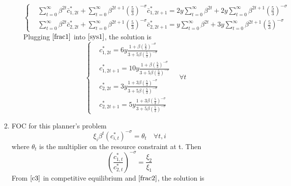 \documentclass{article}
\begin{document}
\begin{enumerate}
\begin{enumerate}
\begin{equation}
                \left\{\begin{aligned}
                    &\sum_{t=0}^\infty\beta^{2t}\bar{c}_{1,2t}^\ast+\sum_{t=0}^\infty\beta^{2t+1}\left(\frac{5}{3}\right)^{-\sigma}\bar{c}_{1,2t+1}^\ast=2y\sum_{t=0}^\infty\beta^{2t}+2y\sum_{t=0}^\infty\beta^{2t+1}\left(\frac{5}{3}\right)^{-\sigma}\\
                    &\sum_{t=0}^\infty\beta^{2t}\bar{c}_{2,2t}^\ast+\sum_{t=0}^\infty\beta^{2t+1}\left(\frac{5}{3}\right)^{-\sigma}\bar{c}_{2,2t+1}^\ast=y\sum_{t=0}^\infty\beta^{2t}+3y\sum_{t=0}^\infty\beta^{2t+1}\left(\frac{5}{3}\right)^{-\sigma}
                \end{aligned}\right.\label{sys1}
            \end{equation}
            Plugging \(\eqref{frac1}\) into \(\eqref{sys1}\), the solution is
            \begin{equation*}
                \left\{\begin{aligned}
                    &c_{1,2t}^\ast=6y\frac{1+\beta\left(\frac{5}{3}\right)^{-\sigma}}{3+5\beta\left(\frac{5}{3}\right)^{-\sigma}}\\
                    &c_{1,2t+1}^\ast=10y\frac{1+\beta\left(\frac{5}{3}\right)^{-\sigma}}{3+5\beta\left(\frac{5}{3}\right)^{-\sigma}}\\
                    &c_{2,2t}^\ast=3y\frac{1+3\beta\left(\frac{5}{3}\right)^{-\sigma}}{3+5\beta\left(\frac{5}{3}\right)^{-\sigma}}\\
                    &c_{2,2t+1}^\ast=5y\frac{1+3\beta\left(\frac{5}{3}\right)^{-\sigma}}{3+5\beta\left(\frac{5}{3}\right)^{-\sigma}}
                \end{aligned}\right.
                \quad\forall t
            \end{equation*}
        \end{enumerate}
        \item FOC for this planner's problem 
        \begin{equation*}
            \xi_i\beta^t(c_{i,t}^\ast)^{-\sigma}=\theta_t\quad\forall t,i
        \end{equation*}
        where $\theta_t$ is the multiplier on the resource constraint at t. Then
        \begin{equation}
            \left(\frac{c_{1,t}^\ast}{c_{2,t}^\ast}\right)^{-\sigma}=\frac{\xi_2}{\xi_1}\label{frac2}
        \end{equation}
        From \(\eqref{c3}\) in competitive equilibrium and \(\eqref{frac2}\), the solution is
        \begin{equation}

\end{equation}
\end{enumerate}
\end{document}

